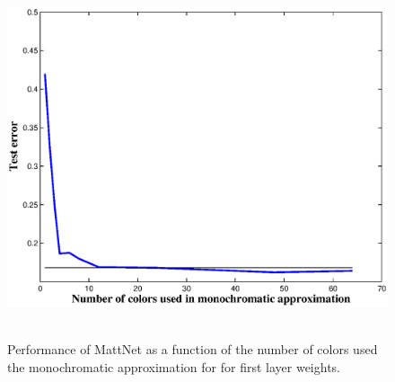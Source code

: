 \begin{figure}[t]
\centering
\mbox{
  \includegraphics[width=0.75\linewidth]{img/layer1testerror_vs_numcolors.eps} 
}
\label{monochromatic_numcolors_vs_testerr}
\caption{Performance of MattNet as a function of the number of colors used the monochromatic approximation for for first layer weights.}
\end{figure}

